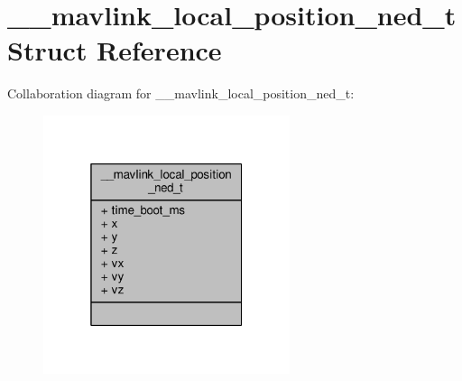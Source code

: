\hypertarget{struct____mavlink__local__position__ned__t}{\section{\+\_\+\+\_\+mavlink\+\_\+local\+\_\+position\+\_\+ned\+\_\+t Struct Reference}
\label{struct____mavlink__local__position__ned__t}
}


Collaboration diagram for \+\_\+\+\_\+mavlink\+\_\+local\+\_\+position\+\_\+ned\+\_\+t\+:
\nopagebreak
\begin{figure}[H]
\begin{center}
\leavevmode
\includegraphics[width=205pt]{struct____mavlink__local__position__ned__t__coll__graph}
\end{center}
\end{figure}
